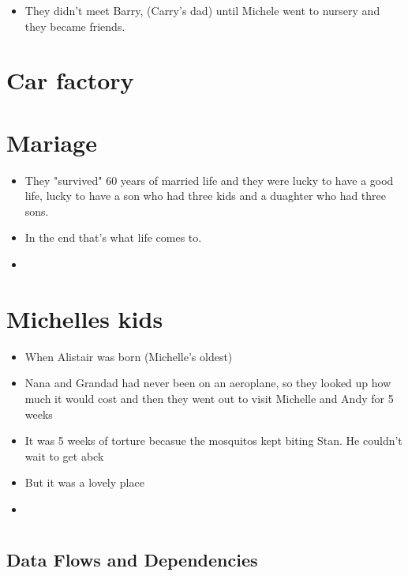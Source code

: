 \documentclass[10pt,twocolumn,letterpaper]{article}
\begin{document}
\begin{itemize}
    \item They didn't meet Barry, (Carry's dad) until Michele went to nursery and they became friends.
\end{itemize}

\section{Car factory}

\section{Mariage}


\begin{itemize}
    \item They "survived" 60 years of married life and they were lucky to have a good life, lucky to have a son who had three kids and a duaghter who had three sons.
    \item In the end that's what life comes to.
    \item 
\end{itemize}


\section{Michelles kids}


\begin{itemize}
    \item When Alistair was born (Michelle's oldest)
    \item Nana and Grandad had never been on an aeroplane, so they looked up how much it would cost and then they went out to visit Michelle and Andy for 5 weeks
    \item It was 5 weeks of torture becasue the mosquitos kept biting Stan. He couldn't wait to get abck
    \item But it was a lovely place
    \item 
\end{itemize}



\clearpage

\section{}
\subsection{Data Flows and Dependencies}
\end{document}
